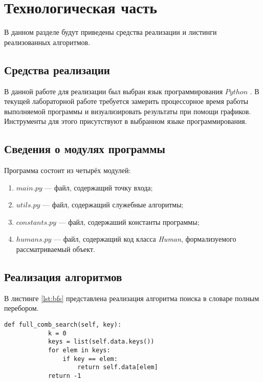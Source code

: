 \chapter{Технологическая часть}
В данном разделе будут приведены средства реализации и листинги реализованных алгоритмов.

\section{Средства реализации}
В данной работе для реализации был выбран язык программирования $Python$ \cite{pythonlang}. В текущей лабораторной работе требуется замерить процессорное время работы выполняемой программы
и визуализировать результаты при помощи графиков. Инструменты для этого присутствуют в выбранном языке программирования.

\section{Сведения о модулях программы}
Программа состоит из четырёх модулей:
\begin{enumerate}[label=\arabic*)]
	\item $main.py$ --- файл, содержащий точку входа;
	\item $utils.py$ --- файл, содержащий служебные алгоритмы;
	\item $constants.py$ --- файл, содержаший константы программы;
	\item $humans.py$ --- файл, содержащий код класса \textit{Human}, формализуемого рассматриваемый объект. 
\end{enumerate}

\section{Реализация алгоритмов}
В листинге \ref{lst:bfs} представлена реализация алгоритма поиска в словаре полным перебором.
\clearpage

\begin{center}
	\captionsetup{justification=raggedright,singlelinecheck=off}

	\begin{lstlisting}[label=lst:bfs,caption=Реализация алгоритма поиска полным перебором]
		def full_comb_search(self, key):
			k = 0
			keys = list(self.data.keys())
			for elem in keys:
				if key == elem:
					return self.data[elem]
			return -1
	\end{lstlisting}
\end{center}

